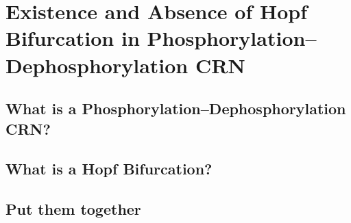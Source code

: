 \chapter{Existence and Absence of Hopf Bifurcation in Phosphorylation–Dephosphorylation CRN}

\section{What is a Phosphorylation–Dephosphorylation CRN?}  

\section{What is a Hopf Bifurcation?}

\section{Put them together}